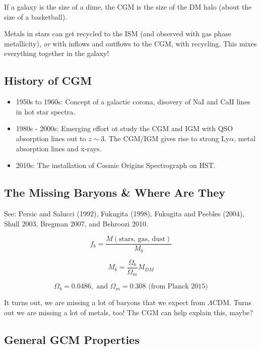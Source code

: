 \documentclass{article}
\begin{document}
If a galaxy is the size of a dime, the CGM is the size of the DM halo (about the size of a basketball).

Metals in stars can get recycled to the ISM (and observed with gas phase metallicity), \textit{or} with inflows and outflows to the CGM, with recycling. This mixes everything together in the galaxy! 
\subsection{History of CGM}

\begin{itemize}
    \item 1950s to 1960s: Concept of a galactic corona, disovery of NaI and CaII lines in hot star spectra.
    \item 1980s - 2000s: Emerging effort ot study the CGM and IGM with QSO absorption lines out to $z\sim3$. The CGM/IGM gives rise to strong Ly$\alpha$, metal absorption lines and x-rays. 
    \item 2010s: The installation of Cosmic Origins Spectrograph on HST.
\end{itemize}

\subsection{The Missing Baryons \& Where Are They}

See: Persic and Salucci (1992), Fukugita (1998), Fukugita and Peebles (2004), Shull 2003, Bregman 2007, and Behroozi 2010.

\begin{equation}
    f_b = \frac{M(\text{stars, gas, dust})}{M_b}
\end{equation}

\begin{equation}
    M_b = \frac{\Omega_{b}}{\Omega_{m}} M_{DM}
\end{equation}

\begin{equation}
    \Omega_{b} = 0.0486, \text{ and } \Omega_{m} = 0.308 \text{ (from Planck 2015)}
\end{equation}

It turns out, we are missing a lot of baryons that we expect from $\Lambda$CDM. Turns out we are missing a lot of metals, too! The CGM can help explain this, maybe?

\subsection{General GCM Properties}
\end{document}
